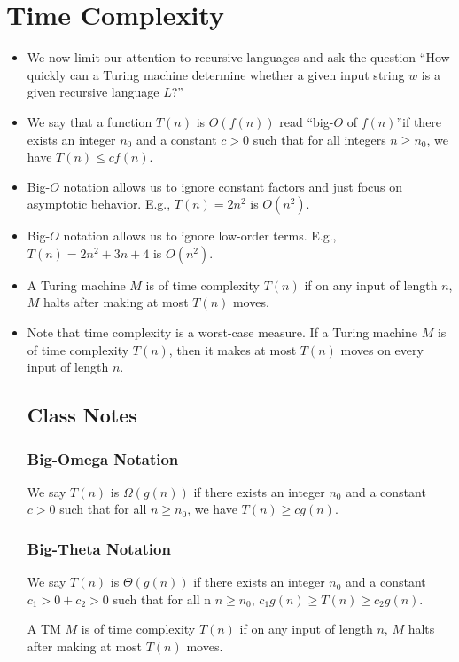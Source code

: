\documentclass[]{article}
\begin{document}
\section{Time Complexity}
\begin{itemize}
\item We now limit our attention to recursive languages and ask the question
``How quickly can a Turing machine determine whether a given input string $w$ is
a given recursive language $L$?''
\item We say that a function $T(n)$ is $O(f(n))$ \lbrack read ``big-$O$ of
$f(n)$''\rbrack if there exists an integer $n_0$ and a constant $c > 0$ such
that for all integers $n \geq n_0$, we have $T(n) \leq cf(n)$.
\item Big-$O$ notation allows us to ignore constant factors and just focus on
asymptotic behavior. E.g., $T(n) = 2n^2$ is $O(n^2)$.
\item Big-$O$ notation allows us to ignore low-order terms. E.g., $T(n) = 2n^2 +
3n + 4$ is $O(n^2)$.
\item A Turing machine $M$ is of time complexity $T(n)$ if on any input of
length $n$, $M$ halts after making at most $T(n)$ moves.
\item Note that time complexity is a worst-case measure. If a Turing machine $M$
is of time complexity $T(n)$, then it makes at most $T(n)$ moves on every input
of length $n$.
\subsection*{Class Notes}
\subsubsection*{Big-Omega Notation}
We say $T(n)$ is $\Omega(g(n))$ if there exists an integer $n_0$ and a constant
$c > 0$ such that for all $n \geq n_0$, we have $T(n) \geq cg(n)$.
\subsubsection*{Big-Theta Notation}
We say $T(n)$ is $\Theta(g(n))$ if there exists an integer $n_0$ and a constant
$c_1 > 0 + c_2 > 0$ such that for all n $n \geq n_0$, $c_1g(n) \geq T(n) \geq
c_2g(n)$.

A TM $M$ is of time complexity $T(n)$ if on any input of length $n$, $M$ halts
after making at most $T(n)$ moves.


\end{itemize}
\end{document}
